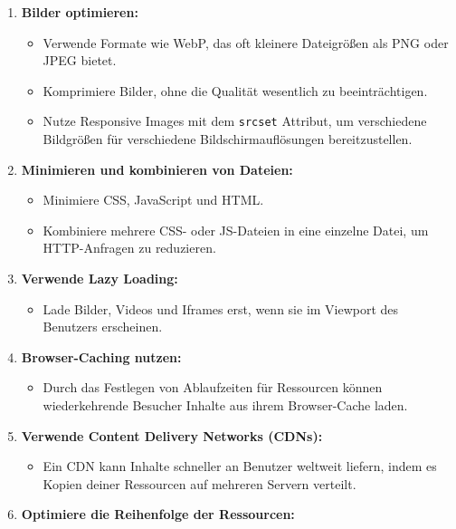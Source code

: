 \documentclass[12pt,a4paper]{scrartcl}
\newcommand{\tightlist}{
  \setlength{\itemsep}{0pt}\setlength{\parskip}{0pt}
}
\begin{document}
\begin{enumerate}
\def\labelenumi{\arabic{enumi}.}
\tightlist
\item
  \textbf{Bilder optimieren:}

  \begin{itemize}
  \tightlist
  \item
    Verwende Formate wie WebP, das oft kleinere Dateigrößen als PNG oder
    JPEG bietet.
  \item
    Komprimiere Bilder, ohne die Qualität wesentlich zu beeinträchtigen.
  \item
    Nutze Responsive Images mit dem {\lstinline!srcset!}
    Attribut, um verschiedene Bildgrößen für verschiedene
    Bildschirmauflösungen bereitzustellen.
  \end{itemize}
\item
  \textbf{Minimieren und kombinieren von Dateien:}

  \begin{itemize}
  \tightlist
  \item
    Minimiere CSS, JavaScript und HTML.
  \item
    Kombiniere mehrere CSS- oder JS-Dateien in eine einzelne Datei, um
    HTTP-Anfragen zu reduzieren.
  \end{itemize}
\item
  \textbf{Verwende Lazy Loading:}

  \begin{itemize}
  \tightlist
  \item
    Lade Bilder, Videos und Iframes erst, wenn sie im Viewport des
    Benutzers erscheinen.
  \end{itemize}
\item
  \textbf{Browser-Caching nutzen:}

  \begin{itemize}
  \tightlist
  \item
    Durch das Festlegen von Ablaufzeiten für Ressourcen können
    wiederkehrende Besucher Inhalte aus ihrem Browser-Cache laden.
  \end{itemize}
\item
  \textbf{Verwende Content Delivery Networks (CDNs):}

  \begin{itemize}
  \tightlist
  \item
    Ein CDN kann Inhalte schneller an Benutzer weltweit liefern, indem
    es Kopien deiner Ressourcen auf mehreren Servern verteilt.
  \end{itemize}
\item
  \textbf{Optimiere die Reihenfolge der Ressourcen:}


\end{enumerate}
\end{document}
